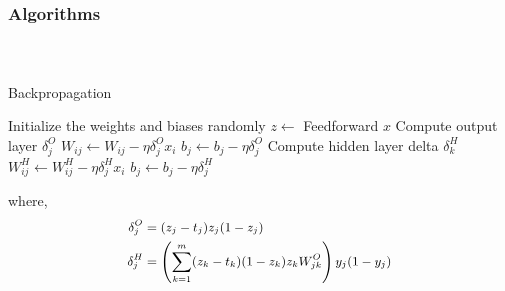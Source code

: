 
\begin{frame}[t]
	\frametitle{Algorithms}
	\framesubtitle{~~}  %

\begin{minipage}[c]{0.45\linewidth}
\begin{algorithm}[H]
	\small
\caption{Backpropagation}
\label{alg:backprop}
\begin{algorithmic}
\STATE Initialize the weights and biases randomly
    \STATE $z\gets$ Feedforward $x$
    \STATE Compute output layer $\delta_j^O$
    \STATE ${W_{ij} \leftarrow W_{ij} - \eta \delta^O_j x_i}$
    \STATE $b_j \leftarrow b_j - \eta\delta^O_j$
      \STATE Compute hidden layer delta $\delta_k^H$
      \STATE ${W^H_{ij} \leftarrow W^H_{ij} - \eta\delta^H_jx_i}$
      \STATE $b_j \leftarrow b_j - \eta\delta^H_j$
    \ENDFOR
  \ENDFOR
\ENDFOR
\end{algorithmic}
\end{algorithm}
\end{minipage}\qquad
\begin{minipage}[c]{0.45\linewidth}
where,
\begin{equation*}
	\small
	\begin{split}
\delta^O_j &= (z_j-t_j)z_j(1-z_j) \\
\delta^H_j &= \left(\sum_{k=1}^m (z_k - t_k)(1-z_k)z_kW_{jk}^O \right)y_j(1-y_j)
\end{split}
\end{equation*}
\end{minipage}

\end{frame}
